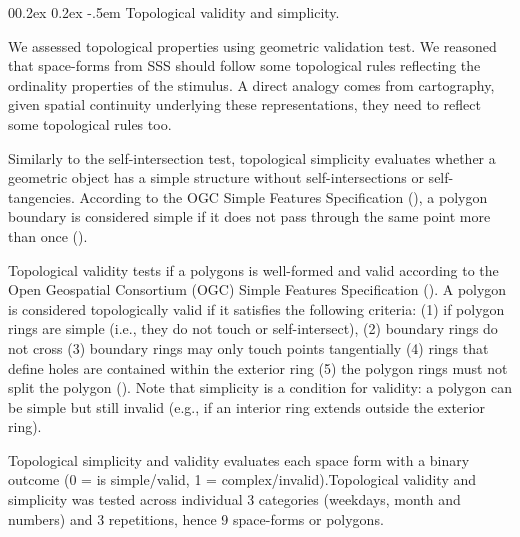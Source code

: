 \documentclass[
  man,
  floatsintext,
  longtable,
  a4paper,
  nolmodern,
  notxfonts,
  notimes,
  colorlinks=true,linkcolor=blue,citecolor=blue,urlcolor=blue]{apa7}
\makeatletter
\renewcommand{\paragraph}{\@startsection{paragraph}{4}{\parindent}%
	{0\baselineskip \@plus 0.2ex \@minus 0.2ex}%
	{-.5em}%
	{\normalfont\normalsize\bfseries\typesectitle}}
\makeatother
\begin{document}
\paragraph{Topological validity and
simplicity.}\label{topological-validity-and-simplicity}

We assessed topological properties using geometric validation test. We
reasoned that space-forms from SSS should follow some topological rules
reflecting the ordinality properties of the stimulus. A direct analogy
comes from cartography, given spatial continuity underlying these
representations, they need to reflect some topological rules too.


Similarly to the self-intersection test, topological simplicity
evaluates whether a geometric object has a simple structure without
self-intersections or self-tangencies. According to the OGC Simple
Features Specification (), a
polygon boundary is considered simple if it does not pass through the
same point more than once ().

Topological validity tests if a polygons is well-formed and valid
according to the Open Geospatial Consortium (OGC) Simple Features
Specification (). A polygon is
considered topologically valid if it satisfies the following criteria:
(1) if polygon rings are simple (i.e., they do not touch or
self-intersect), (2) boundary rings do not cross (3) boundary rings may
only touch points tangentially (4) rings that define holes are contained
within the exterior ring (5) the polygon rings must not split the
polygon ().
Note that simplicity is a condition for validity: a polygon can be
simple but still invalid (e.g., if an interior ring extends outside the
exterior ring).

Topological simplicity and validity evaluates each space form with a
binary outcome (0 = is simple/valid, 1 = complex/invalid).Topological
validity and simplicity was tested across individual 3 categories
(weekdays, month and numbers)
and 3 repetitions, hence 9 space-forms or polygons.
\end{document}
